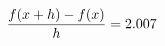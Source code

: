 \documentclass[preview]{standalone}
\begin{document}
\begin{align*}
\special{dvisvgm:raw <g id='unique000'>}\frac{f(x+h)-f(x)}{h} = 2.007\special{dvisvgm:raw </g>}
\end{align*}
\end{document}
